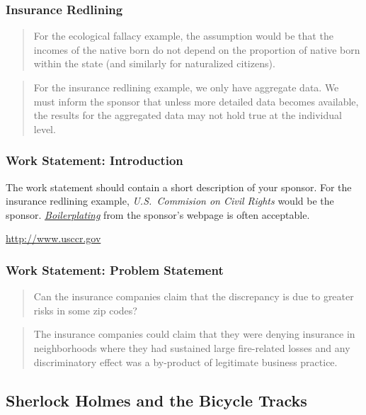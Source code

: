 \begin{frame}[fragile]
    \frametitle{ Insurance Redlining}
    \begin{verse}
For the ecological fallacy example, 
the assumption would be that the incomes of 
the native born do not depend on the proportion of native 
born within the state (and similarly for naturalized citizens).
    \end{verse}
    \vskip0.5in
    \begin{verse}
        For the insurance redlining example, we only have aggregate data.  
        We must inform the sponsor that unless more detailed data becomes
        available, the results for the aggregated data may not hold true 
        at the individual level. 
    \end{verse}
\end{frame}

\begin{frame}[fragile]
    \frametitle{Work Statement: Introduction}
    The work statement should contain a short description 
    of your sponsor.  
    \vskip0.2in
    For the insurance redlining example, 
    \emph{U.S.~Commision on Civil Rights} would be the sponsor.
    \vskip0.2in
    \href{http://en.wikipedia.org/wiki/Boilerplate_%28text%29}{\emph{Boilerplating}} from the sponsor's webpage is often acceptable. 
    \vskip0.5in
    \begin{center}
        \href{http://www.usccr.gov/about/}{http://www.usccr.gov}
    \end{center}
\end{frame}


\begin{frame}   
    \frametitle{Work Statement: Problem Statement}
    \begin{verse}
        Can the insurance companies claim that the discrepancy is due to 
        greater risks in some zip codes?
    \end{verse}
    \vskip0.5in
    \begin{verse}
        The insurance companies could claim that they were denying insurance 
        in neighborhoods where they had sustained large fire-related losses
        and any discriminatory effect was a by-product of legitimate business
        practice.  
    \end{verse}
\end{frame}


\subsection{Sherlock Holmes and the Bicycle Tracks}

